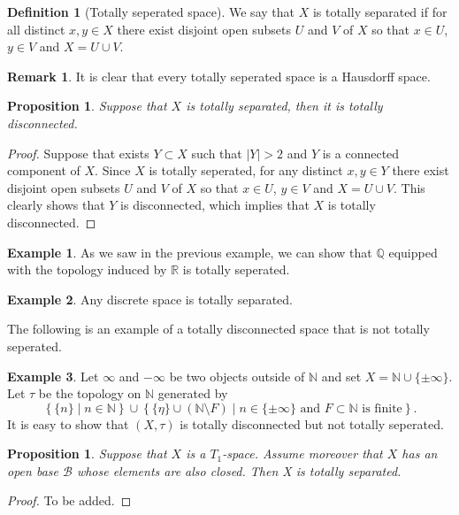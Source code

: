 \documentclass[11pt,a4paper]{article}
\theoremstyle{definition}
\newtheorem{definition}{Definition}[section]
\newtheorem{remark}{Remark}[section]
\newtheorem{example}{Example}[section]
\theoremstyle{plain}
\newtheorem{proposition}[theorem]{Proposition}
\newcommand{\N}{\mathbb{N}}
\newcommand{\Q}{\mathbb{Q}}
\newcommand{\R}{\mathbb{R}}
\newcommand{\set}[2]{ \left\{ #1 \mid #2 \right\} }
\begin{document}
  \begin{definition}[Totally seperated space]
    We say that $X$ is totally separated if for all distinct $x, y \in X$
    there exist disjoint open subsets $U$ and $V$ of $X$ so that 
    $x \in U$, $y \in V$ and $X = U \cup V$.
  \end{definition}

  \begin{remark}
    It is clear that every totally seperated space is a Hausdorff space.
  \end{remark}

  \begin{proposition}
    Suppose that $X$ is totally separated, then it is totally disconnected.
  \end{proposition}
  \begin{proof}
    Suppose that exists $Y \subset X$ such that $|Y| > 2$ and
    $Y$ is a connected component of $X$.
    Since $X$ is totally seperated, for any distinct $x, y \in Y$ there
    exist disjoint open subsets $U$ and $V$ of $X$ so that 
    $x \in U$, $y \in V$ and $X = U \cup V$.
    This clearly shows that $Y$ is disconnected, which implies that $X$ is
    totally disconnected.
  \end{proof}

  \begin{example}
    As we saw in the previous example, we can show that $\Q$ equipped with the
    topology induced by $\R$ is totally seperated.
  \end{example}
  \begin{example}
    Any discrete space is totally separated.
  \end{example}

  The following is an example of a totally disconnected space that is not
  totally seperated.

  \begin{example}
    Let $\infty$ and $-\infty$ be two objects outside of $\N$ and set
    $X = \N \cup\{\pm \infty\}$. Let $\tau$ be the topology on $\N$
    generated by
    \[
      \set{\{n\}}{n \in \N} \cup \set{\{\eta\} \cup (\N \setminus F)}
      {n \in \{\pm \infty\} \text{ and $F \subset \N$ is finite}}.
    \]
    It is easy to show that $(X, \tau)$ is totally disconnected but not
    totally seperated. 
  \end{example}

  \begin{proposition}
    Suppose that $X$ is a $T_1$-space.
    Assume moreover that $X$ has an open base $\mathcal B$ whose elements 
    are also closed. Then X is totally separated.
  \end{proposition}
  \begin{proof}
    To be added.
  \end{proof}
\end{document}
